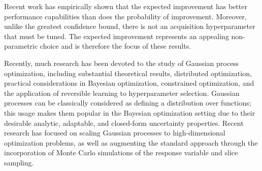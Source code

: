 \documentclass[]{article}
\newcommand{\1}{\mathbf{1}}
\newcommand{\0}{\mathbf{0}}
\begin{document}
Recent work has empirically shown that the expected improvement has better performance capabilities than does the probability of improvement. Moreover, unlike the greatest confidence bound, there is not an acquisition hyperparameter that must be tuned. The expected improvement represents an appealing non-parametric choice and is therefore the focus of these results.

Recently, much research has been devoted to the study of Gaussian process optimization, including substantial theoretical results, distributed optimization, practical considerations in Bayesian optimization, constrained optimization, and the application of reversible learning to hyperparameter selection. Gaussian processes can be classically considered as defining a distribution over functions; this usage makes them popular in the Bayesian optimization setting due to their desirable analytic, adaptable, and closed-form uncertainty properties. Recent research has focused on scaling Gaussian processes to high-dimensional optimization problems, as well as augmenting the standard approach through the incorporation of Monte Carlo simulations of the response variable and slice sampling.
\end{document}
